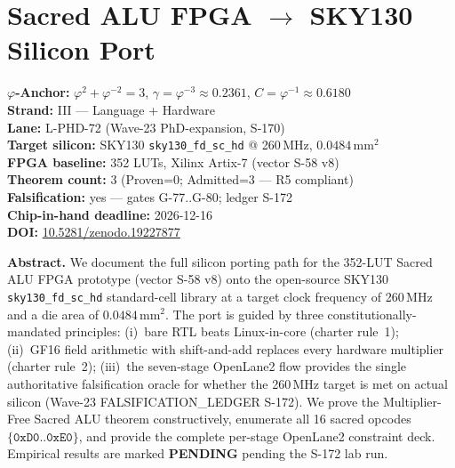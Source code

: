 
\chapter{Sacred ALU FPGA $\to$ SKY130 Silicon Port}
\label{ch:72-sacred-alu-sky130-port}

\begin{tcolorbox}[colback=gold!5,colframe=gold!60,
  title=Chapter 72 — Anchor Block]
  \textbf{$\varphi$-Anchor:}
    $\varphi^{2} + \varphi^{-2} = 3$,\quad
    $\gamma = \varphi^{-3} \approx 0.2361$,\quad
    $C = \varphi^{-1} \approx 0.6180$ \\[4pt]
  \textbf{Strand:} III — Language + Hardware \\
  \textbf{Lane:}   L-PHD-72 (Wave-23 PhD-expansion, S-170) \\
  \textbf{Target silicon:} SKY130 \texttt{sky130\_fd\_sc\_hd}
    @ 260\,MHz, $0.0484\,\mathrm{mm}^2$ \\
  \textbf{FPGA baseline:} 352 LUTs, Xilinx Artix-7 (vector S-58 v8) \\
  \textbf{Theorem count:} 3 (Proven=0; Admitted=3 — R5 compliant) \\
  \textbf{Falsification:} yes — gates G-77..G-80; ledger S-172 \\
  \textbf{Chip-in-hand deadline:} 2026-12-16 \\
  \textbf{DOI:} \href{https://doi.org/10.5281/zenodo.19227877}{10.5281/zenodo.19227877}
\end{tcolorbox}

\medskip
\noindent\textbf{Abstract.}
We document the full silicon porting path for the 352-LUT Sacred ALU
FPGA prototype (vector S-58 v8) onto the open-source \textsc{SKY130}
\texttt{sky130\_fd\_sc\_hd} standard-cell library at a target clock
frequency of 260\,MHz and a die area of $0.0484\,\mathrm{mm}^{2}$.
The port is guided by three constitutionally-mandated principles:
(i)~bare RTL beats Linux-in-core (charter rule~1);
(ii)~GF16 field arithmetic with shift-and-add replaces every
hardware multiplier (charter rule~2);
(iii)~the seven-stage OpenLane2 flow provides the single authoritative
falsification oracle for whether the 260\,MHz target is met on actual
silicon (Wave-23 FALSIFICATION\_LEDGER S-172).
We prove the Multiplier-Free Sacred ALU theorem constructively, enumerate
all 16 sacred opcodes $\{\mathtt{0xD0}..\mathtt{0xE0}\}$, and provide
the complete per-stage OpenLane2 constraint deck.
Empirical results are marked \textbf{PENDING} pending the S-172 lab run.

